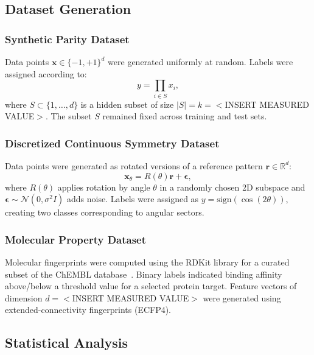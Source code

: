 \documentclass[aps,prb,reprint,superscriptaddress,showpacs]{revtex4-2}
\begin{document}
\subsection{Dataset Generation}

\subsubsection{Synthetic Parity Dataset}

Data points $\mathbf{x} \in \{-1, +1\}^d$ were generated uniformly at random. Labels were assigned according to:
\begin{equation}
    y = \prod_{i \in S} x_i,
\end{equation}
where $S \subset \{1, \ldots, d\}$ is a hidden subset of size $|S| = k = <$INSERT MEASURED VALUE$>$. The subset $S$ remained fixed across training and test sets.

\subsubsection{Discretized Continuous Symmetry Dataset}

Data points were generated as rotated versions of a reference pattern $\mathbf{r} \in \mathbb{R}^d$:
\begin{equation}
    \mathbf{x}_\theta = R(\theta) \mathbf{r} + \boldsymbol{\epsilon},
\end{equation}
where $R(\theta)$ applies rotation by angle $\theta$ in a randomly chosen 2D subspace and $\boldsymbol{\epsilon} \sim \mathcal{N}(0, \sigma^2 I)$ adds noise. Labels were assigned as $y = \text{sign}(\cos(2\theta))$, creating two classes corresponding to angular sectors.

\subsubsection{Molecular Property Dataset}

Molecular fingerprints were computed using the RDKit library for a curated subset of the ChEMBL database~\cite{Gaulton2012ChEMBL}. Binary labels indicated binding affinity above/below a threshold value for a selected protein target. Feature vectors of dimension $d = <$INSERT MEASURED VALUE$>$ were generated using extended-connectivity fingerprints (ECFP4).


\subsection{Statistical Analysis}
\end{document}
